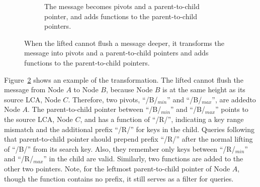 \begin{figure}
\begin{subfigure}{\textwidth}
        \caption{\label{subfig:spvt-2} The \goto message becomes pivots and a
            parent-to-child pointer, and adds \xf functions to the parent-to-child pointers.}
    \end{subfigure}
    \caption[Transform a \goto message into pivots and a parent-to-child pointer]{\label{fig:spvt}
        When the lifted \bedag cannot flush a \goto message deeper, it
        transforms the \goto message into pivots and a parent-to-child pointers
        and adds \xf functions to the parent-to-child pointers.}
\end{figure}

Figure~\ref{fig:spvt} shows an example of the transformation.
The lifted \bedag cannot flush the \goto message from Node $A$ to Node $B$,
because Node $B$ is at the same height as its source LCA, Node $C$.
Therefore, two pivots, ``/B/$_{min}$'' and ``/B/$_{max}$'', are addedto Node $A$.
The parent-to-child pointer between ``/B/$_{min}$'' and ``/B/$_{max}$'' points
to the source LCA, Node $C$, and has a \xf function of ``/R/'', indicating a
key range mismatch and the additional prefix ``/R/'' for keys in the child.
Queries following that parent-to-child pointer should prepend prefix ``/R/''
after the normal lifting of ``/B/'' from its search key.
Also, they remember only keys between ``/R/$_{min}$'' and ``/R/$_{max}$'' in
the child are valid.
Similarly, two \xf functions are added to the other two pointers.
Note, for the leftmost parent-to-child pointer of Node $A$, though the \xf
function contains no prefix, it still serves as a filter for queries.

